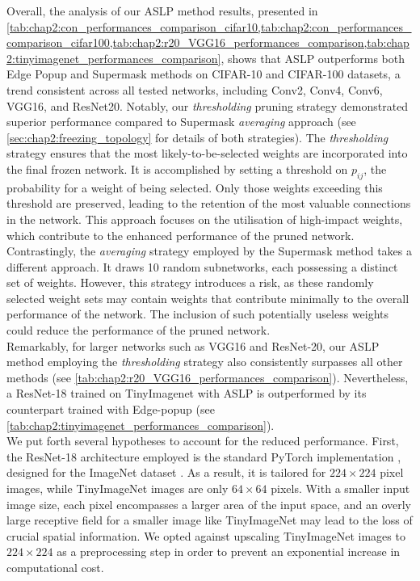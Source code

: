 Overall, the analysis of our \ac{ASLP} method results, presented in
\cref{tab:chap2:con_performances_comparison_cifar10,tab:chap2:con_performances_comparison_cifar100,tab:chap2:r20_VGG16_performances_comparison,tab:chap2:tinyimagenet_performances_comparison},
shows that \ac{ASLP} outperforms both Edge Popup and Supermask methods on
CIFAR-10 and CIFAR-100 datasets, a trend consistent across all tested networks,
including Conv2, Conv4, Conv6, VGG16, and ResNet20. Notably, our
\textit{thresholding} pruning strategy demonstrated superior performance
compared to Supermask \textit{averaging} approach (see
\cref{sec:chap2:freezing_topology} for details of both strategies). The
\textit{thresholding} strategy ensures that the most likely-to-be-selected
weights are incorporated into the final frozen network. It is accomplished by
setting a threshold on $p_{ij}$, the probability for a weight of being selected.
Only those weights exceeding this threshold are preserved, leading to the
retention of the most valuable connections in the network. This approach focuses
on the utilisation of high-impact weights, which contribute to the enhanced
performance of the pruned network. Contrastingly, the \textit{averaging}
strategy employed by the Supermask method \cite{DBLP:conf/nips/ZhouLLY19} takes
a different approach. It draws 10 random subnetworks, each possessing a distinct
set of weights. However, this strategy introduces a risk, as these randomly
selected weight sets may contain weights that contribute minimally to the
overall performance of the network. The inclusion of such potentially useless
weights could reduce the performance of the pruned network.\\

Remarkably, for larger networks such as VGG16 and ResNet-20, our \ac{ASLP}
method employing the \textit{thresholding} strategy also consistently surpasses
all other methods (see \cref{tab:chap2:r20_VGG16_performances_comparison}).
Nevertheless, a ResNet-18 trained on TinyImagenet with \ac{ASLP} is outperformed
by its counterpart trained with Edge-popup (see
\cref{tab:chap2:tinyimagenet_performances_comparison}).\\

We put forth several hypotheses to account for the reduced performance. First,
the ResNet-18 architecture employed is the standard PyTorch implementation
\cite{pytorch_resnet18}, designed for the ImageNet dataset
\cite{deng2009imagenet}. As a result, it is tailored for $224 \times 224$ pixel
images, while TinyImageNet images are only $64 \times 64$ pixels. With a smaller
input image size, each pixel encompasses a larger area of the input space, and
an overly large receptive field for a smaller image like TinyImageNet may lead
to the loss of crucial spatial information. We opted against upscaling
TinyImageNet images to $224 \times 224$ as a preprocessing step in order to
prevent an exponential increase in computational cost.\\

